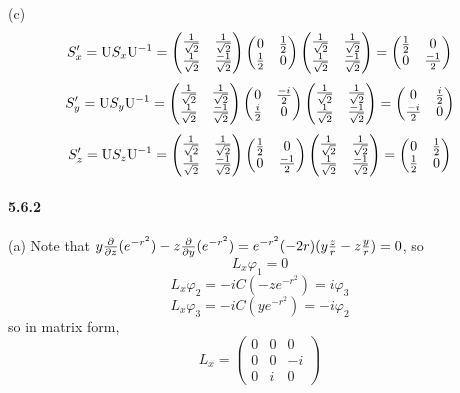 \documentclass[a4paper]{article}
\begin{document}
(c) 
\[
S_x'=\mathrm{U}S_x\mathrm{U}^{-1}=
\begin{pmatrix}
\frac{1}{\sqrt{2}}&\frac{1}{\sqrt{2}}\\
\frac{1}{\sqrt{2}}&\frac{-1}{\sqrt{2}}
\end{pmatrix}
\begin{pmatrix}
0&\frac{1}{2}\\
\frac{1}{2}&0
\end{pmatrix}
\begin{pmatrix}
\frac{1}{\sqrt{2}}&\frac{1}{\sqrt{2}}\\
\frac{1}{\sqrt{2}}&\frac{-1}{\sqrt{2}}
\end{pmatrix}=\begin{pmatrix}
\frac{1}{2}&0\\
0&\frac{-1}{2}
\end{pmatrix}
\]
\[
S_y'=\mathrm{U}S_y\mathrm{U}^{-1}=
\begin{pmatrix}
\frac{1}{\sqrt{2}}&\frac{1}{\sqrt{2}}\\
\frac{1}{\sqrt{2}}&\frac{-1}{\sqrt{2}}
\end{pmatrix}
\begin{pmatrix}
0&\frac{-i}{2}\\
\frac{i}{2}&0
\end{pmatrix}
\begin{pmatrix}
\frac{1}{\sqrt{2}}&\frac{1}{\sqrt{2}}\\
\frac{1}{\sqrt{2}}&\frac{-1}{\sqrt{2}}
\end{pmatrix}=\begin{pmatrix}
0&\frac{i}{2}\\
\frac{-i}{2}&0
\end{pmatrix}
\]
\[
S_z'=\mathrm{U}S_z\mathrm{U}^{-1}=
\begin{pmatrix}
\frac{1}{\sqrt{2}}&\frac{1}{\sqrt{2}}\\
\frac{1}{\sqrt{2}}&\frac{-1}{\sqrt{2}}
\end{pmatrix}
\begin{pmatrix}
\frac{1}{2}&0\\
0&\frac{-1}{2}
\end{pmatrix}
\begin{pmatrix}
\frac{1}{\sqrt{2}}&\frac{1}{\sqrt{2}}\\
\frac{1}{\sqrt{2}}&\frac{-1}{\sqrt{2}}
\end{pmatrix}=\begin{pmatrix}
0&\frac{1}{2}\\
\frac{1}{2}&0
\end{pmatrix}
\]

\paragraph{5.6.2}
(a) Note that $y\frac{\partial}{\partial z}(e^{-r^2})-z\frac{\partial}{\partial y}(e^{-r^2})=e^{-r^2}(-2r)(y\frac{z}{r}-z\frac{y}{r})=0$, so
\[
L_x\varphi_1=0
\]
\[
L_x\varphi_2=-iC(-ze^{-r^2})=i\varphi_3
\]
\[
L_x\varphi_3=-iC(ye^{-r^2})=-i\varphi_2
\]
so in matrix form,
\[
L_x=
\begin{pmatrix}
0&0&0\\
0&0&-i\\
0&i&0
\end{pmatrix}
\]
\end{document}
